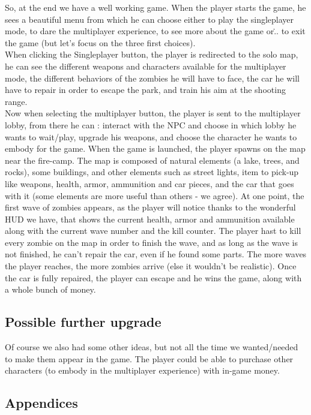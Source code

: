 \documentclass[12pt]{article}
\begin{document}
    So, at the end we have a well working game. When the player starts the game, he sees a beautiful menu from which he can choose either to play the singleplayer mode, to dare the multiplayer experience, to see more about the game or\... to exit the game (but let's focus on the three first choices).\\
    When clicking the Singleplayer button, the player is redirected to the solo map, he can see the different weapons and characters available for the multiplayer mode, the different behaviors of the zombies he will have to face, the car he will have to repair in order to escape the park, and train his aim at the shooting range.\\
    Now when selecting the multiplayer button, the player is sent to the multiplayer lobby, from there he can : interact with the NPC and choose in which lobby he wants to wait/play, upgrade his weapons, and choose the character he wants to embody for the game. When the game is launched, the player spawns on the map near the fire-camp. The map is composed of natural elements (a lake, trees, and rocks), some buildings, and other elements such as street lights, item to pick-up like weapons, health, armor, ammunition and car pieces, and the car that goes with it (some elements are more useful than others - we agree). At one point, the first wave of zombies appears, as the player will notice thanks to the wonderful HUD we have, that shows the current health, armor and ammunition available along with the current wave number and the kill counter. The player hast to kill every zombie on the map in order to finish the wave, and as long as the wave is not finished, he can't repair the car, even if he found some parts. The more waves the player reaches, the more zombies arrive (else it wouldn't be realistic). Once the car is fully repaired, the player can escape and he wins the game, along with a whole bunch of money.
        
    \subsection{Possible further upgrade}
    
    Of course we also had some other ideas, but not all the time we wanted/needed to make them appear in the game. The player could be able to purchase other characters (to embody in the multiplayer experience) with in-game money.
    
    \subsection{Appendices}
    
\end{document}
